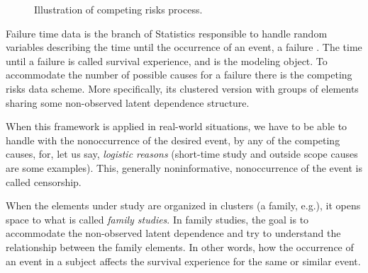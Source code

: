 \documentclass[oupdraft]{bio}
\begin{document}
\begin{figure}[H]
 \centering
 \caption{Illustration of competing risks process.}
 \label{fig:crp}
\end{figure}

Failure time data is the branch of Statistics responsible to handle
random variables describing the time until the occurrence of an event, a
failure \citep{kalb&prentice,hougaard00}. The time until a failure is
called survival experience, and is the modeling object. To accommodate
the number of possible causes for a failure there is the competing risks
data scheme. More specifically, its clustered version with groups of
elements sharing some non-observed latent dependence structure.

When this framework is applied in real-world situations, we have to be
able to handle with the nonoccurrence of the desired event, by any of
the competing causes, for, let us say, \textit{logistic reasons}
(short-time study and outside scope causes are some examples). This,
generally noninformative, nonoccurrence of the event is called
censorship.

When the elements under study are organized in clusters (a family,
e.g.), it opens space to what is called \textit{family studies}. In
family studies, the goal is to accommodate the non-observed latent
dependence and try to understand the relationship between the family
elements. In other words, how the occurrence of an event in a subject
affects the survival experience for the same or similar event.
\end{document}
